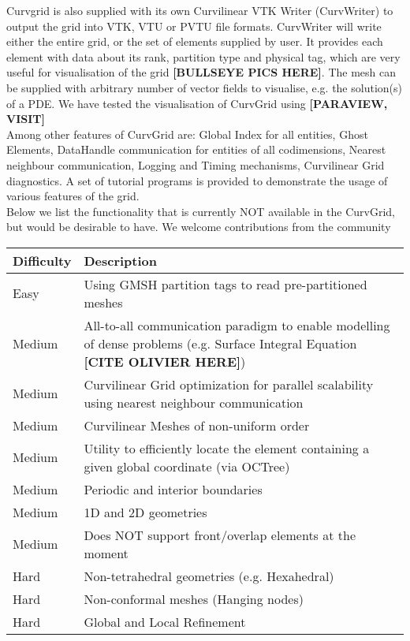 \noindent
Curvgrid is also supplied with its own Curvilinear VTK Writer (CurvWriter) to output the grid into VTK, VTU or PVTU file formats. CurvWriter will write either the entire grid, or the set of elements supplied by user. It provides each element with data about its rank, partition type and physical tag, which are very useful for visualisation of the grid \textbf{[BULLSEYE PICS HERE]}. The mesh can be supplied with arbitrary number of vector fields to visualise, e.g. the solution(s) of a PDE. We have tested the visualisation of CurvGrid using \textbf{[PARAVIEW, VISIT]} \\

\noindent
Among other features of CurvGrid are: Global Index for all entities, Ghost Elements, DataHandle communication for entities of all codimensions, Nearest neighbour communication, Logging and Timing mechanisms, Curvilinear Grid diagnostics. A set of tutorial programs is provided to demonstrate the usage of various features of the grid. \\

\noindent
Below we list the functionality that is currently NOT available in the CurvGrid, but would be desirable to have. We welcome contributions from the community \\

\noindent
\begin{tabularx}{\textwidth}{l X}
\hline
     Difficulty & Description \\
\hline
	 Easy & Using GMSH partition tags to read pre-partitioned meshes \\
	 Medium & All-to-all communication paradigm to enable modelling of dense problems (e.g. Surface Integral Equation \textbf{[CITE OLIVIER HERE]}) \\
	 Medium & Curvilinear Grid optimization for parallel scalability using nearest neighbour communication \\
	 Medium & Curvilinear Meshes of non-uniform order \\
	 Medium & Utility to efficiently locate the element containing a given global coordinate (via OCTree) \\
	 Medium & Periodic and interior boundaries \\
	 Medium & 1D and 2D geometries \\
	 Medium & Does NOT support front/overlap elements at the moment \\
	 Hard & Non-tetrahedral geometries (e.g. Hexahedral) \\
	 Hard & Non-conformal meshes (Hanging nodes) \\
	 Hard & Global and Local Refinement \\
\hline
\end{tabularx}

